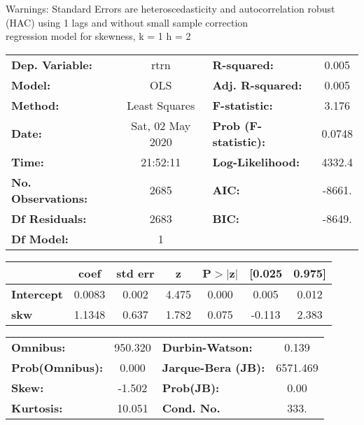 Warnings: \newline
 [1] Standard Errors are heteroscedasticity and autocorrelation robust (HAC) using 1 lags and without small sample correction\\ 

regression model for skewness, k = 1 h = 2\begin{center}
\begin{tabular}{lclc}
\toprule
\textbf{Dep. Variable:}    &       rtrn       & \textbf{  R-squared:         } &     0.005   \\
\textbf{Model:}            &       OLS        & \textbf{  Adj. R-squared:    } &     0.005   \\
\textbf{Method:}           &  Least Squares   & \textbf{  F-statistic:       } &     3.176   \\
\textbf{Date:}             & Sat, 02 May 2020 & \textbf{  Prob (F-statistic):} &   0.0748    \\
\textbf{Time:}             &     21:52:11     & \textbf{  Log-Likelihood:    } &    4332.4   \\
\textbf{No. Observations:} &        2685      & \textbf{  AIC:               } &    -8661.   \\
\textbf{Df Residuals:}     &        2683      & \textbf{  BIC:               } &    -8649.   \\
\textbf{Df Model:}         &           1      & \textbf{                     } &             \\
\bottomrule
\end{tabular}
\begin{tabular}{lcccccc}
                   & \textbf{coef} & \textbf{std err} & \textbf{z} & \textbf{P$> |$z$|$} & \textbf{[0.025} & \textbf{0.975]}  \\
\midrule
\textbf{Intercept} &       0.0083  &        0.002     &     4.475  &         0.000        &        0.005    &        0.012     \\
\textbf{skw}       &       1.1348  &        0.637     &     1.782  &         0.075        &       -0.113    &        2.383     \\
\bottomrule
\end{tabular}
\begin{tabular}{lclc}
\textbf{Omnibus:}       & 950.320 & \textbf{  Durbin-Watson:     } &    0.139  \\
\textbf{Prob(Omnibus):} &   0.000 & \textbf{  Jarque-Bera (JB):  } & 6571.469  \\
\textbf{Skew:}          &  -1.502 & \textbf{  Prob(JB):          } &     0.00  \\
\textbf{Kurtosis:}      &  10.051 & \textbf{  Cond. No.          } &     333.  \\
\bottomrule
\end{tabular}
\end{center}

